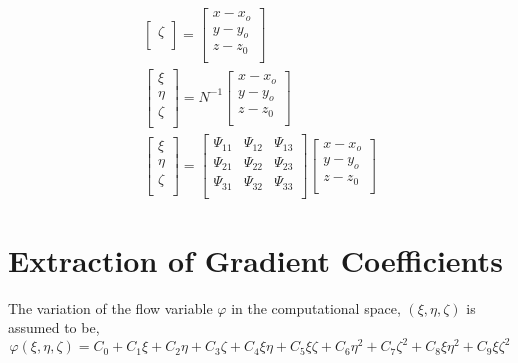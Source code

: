 \begin{equation}
\begin{gathered}
\begin{bmatrix}
    \zeta\\
    \end{bmatrix}=\begin{bmatrix}
    x-x_o\\
    y-y_o\\
    z-z_0\\
    \end{bmatrix}\\
    \begin{bmatrix}
    \xi\\
    \eta\\
    \zeta\\
    \end{bmatrix}=N^{-1}\begin{bmatrix}
    x-x_o\\
    y-y_o\\
    z-z_0\\
    \end{bmatrix}\\
    \begin{bmatrix}
    \xi\\
    \eta\\
    \zeta\\
    \end{bmatrix}=\begin{bmatrix}
    \Psi_{11} & \Psi_{12} & \Psi_{13}\\
    \Psi_{21} & \Psi_{22} & \Psi_{23}\\
    \Psi_{31} & \Psi_{32} & \Psi_{33}\\
    \end{bmatrix}
    \begin{bmatrix}
    x-x_o\\
    y-y_o\\
    z-z_0\\
    \end{bmatrix}
    \end{gathered}
    \end{equation}
    
\section{Extraction of Gradient Coefficients}
\hspace{0.25cm}The variation of the flow variable $\varphi$ in the computational space, $(\xi,\eta,\zeta)$ is assumed to be,
\begin{equation}\label{eq:nmnm}
    {\varphi}(\xi,\eta,\zeta)=C_0+C_1\xi+C_2\eta+C_3\zeta+C_4\xi\eta+C_5\xi\zeta+C_6\eta^2+C_7\zeta^2+C_8\xi\eta^2+C_9\xi\zeta^2
\end{equation}

